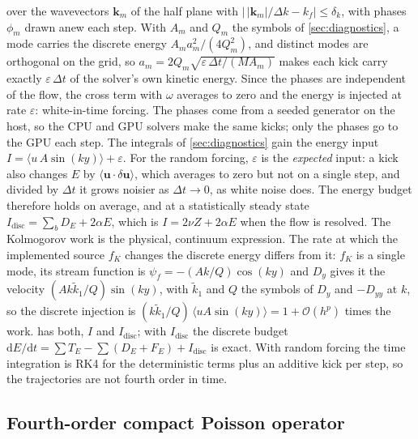 \documentclass[11pt,a4paper]{article}
\newcommand{\Oh}{\mathcal{O}}
\newcommand{\code}[1]{\texttt{\detokenize{#1}}}
\begin{document}
over the wavevectors $\mathbf{k}_m$ of the half plane with $|\,|\mathbf{k}_m|/\Delta k-k_f|\le\delta_k$, with phases $\phi_m$ drawn anew each step.  With $A_m$ and $Q_m$ the symbols of \cref{sec:diagnostics}, a mode carries the discrete energy $A_ma_m^2/(4Q_m^2)$, and distinct modes are orthogonal on the grid, so $a_m=2Q_m\sqrt{\varepsilon\,\Delta t/(MA_m)}$ makes each kick carry exactly $\varepsilon\,\Delta t$ of the solver's own kinetic energy.  Since the phases are independent of the flow, the cross term with $\omega$ averages to zero and the energy is injected at rate $\varepsilon$: white-in-time forcing.  The phases come from a seeded generator on the host, so the CPU and GPU solvers make the same kicks; only the phases go to the GPU each step.  The integrals of \cref{sec:diagnostics} gain the energy input $I=\langle u\,A\sin(ky)\rangle+\varepsilon$.  For the random forcing, $\varepsilon$ is the \emph{expected} input: a kick also changes $E$ by $\langle\mathbf{u}\cdot\delta\mathbf{u}\rangle$, which averages to zero but not on a single step, and divided by $\Delta t$ it grows noisier as $\Delta t\to0$, as white noise does.  The energy budget therefore holds on average, and at a statistically steady state $I_{\mathrm{disc}}=\sum_bD_E+2\alpha E$, which is $I=2\nu Z+2\alpha E$ when the flow is resolved.  The Kolmogorov work is the physical, continuum expression.  The rate at which the implemented source $f_K$ changes the discrete energy differs from it: $f_K$ is a single mode, its stream function is $\psi_f=-(Ak/Q)\cos(ky)$ and $D_y$ gives it the velocity $(Ak\tilde k_1/Q)\sin(ky)$, with $\tilde k_1$ and $Q$ the symbols of $D_y$ and $-D_{yy}$ at $k$, so the discrete injection is $(k\tilde k_1/Q)\,\langle uA\sin(ky)\rangle=1+\Oh(h^p)$ times the work.  \code{integrals.csv} has both, $I$ and $I_{\mathrm{disc}}$; with $I_{\mathrm{disc}}$ the discrete budget $\mathrm{d}E/\mathrm{d}t=\sum T_E-\sum(D_E+F_E)+I_{\mathrm{disc}}$ is exact.  With random forcing the time integration is RK4 for the deterministic terms plus an additive kick per step, so the trajectories are not fourth order in time.

\subsection{Fourth-order compact Poisson operator}
\label{sec:compact-poisson}
\end{document}

